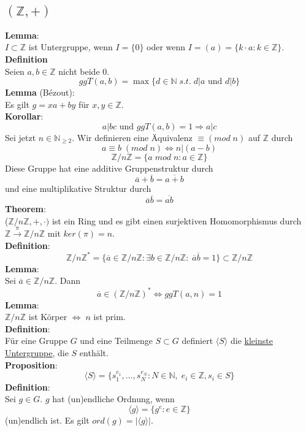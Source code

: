 \documentclass[a4paper, 12pt]{article}
\begin{document}
\subsection{$(\mathbb{Z}, +)$}
\textbf{Lemma}:\\ $I\subset \mathbb{Z}$ ist Untergruppe, wenn $I = \{0\}$ oder wenn $I = (a) = \{k\cdot a: k \in \mathbb{Z}\}$.
\textbf{Definition}\\
Seien $a,b\in\mathbb{Z}$ nicht beide 0. \[ggT(a,b) = \max\{d \in \mathbb{N} \; s.t.\; d|a \text{ und } d|b\}\]
\textbf{Lemma} (Bézout):\\
Es gilt $g = xa+by$ für $x,y \in \mathbb{Z}$.\\
\textbf{Korollar}:
\[a|bc \text{ und } ggT(a,b) = 1 \Rightarrow a|c\]
Sei jetzt $n \in \mathbb{N}_{\geq 2}$. Wir definieren eine Äquivalenz $\equiv (mod\; n)$ auf $\mathbb{Z}$ durch \[a\equiv b\; (mod\; n) \Leftrightarrow n|(a-b)\]
\[\mathbb{Z}/n\mathbb{Z} = \{a \;mod\; n: a\in\mathbb{Z}\}\]
Diese Gruppe hat eine additive Gruppenstruktur durch \[\overline{a} + \overline{b} = \overline{a+b}\] und eine multiplikative Struktur durch \[\overline{a}\overline{b} = \overline{ab}\]
\textbf{Theorem}:\\
($\mathbb{Z}/n\mathbb{Z}, +, \cdot)$ ist ein Ring und es gibt einen surjektiven Homomorphismus durch $\mathbb{Z} \overset{\pi}{\to} \mathbb{Z}/n\mathbb{Z}$ mit $ker(\pi) = n$.\\
\textbf{Definition}:\\
\[\mathbb{Z}/n\mathbb{Z}^* = \{\overline{a} \in \mathbb{Z}/n\mathbb{Z}: \exists b \in \mathbb{Z}/n\mathbb{Z}: \; \overline{a}\overline{b} = 1\} \subset \mathbb{Z}/n\mathbb{Z}\]
\textbf{Lemma}:\\
Sei $\overline{a} \in \mathbb{Z}/n\mathbb{Z}$. Dann \[\overline{a} \in (\mathbb{Z}/n\mathbb{Z})^* \Leftrightarrow ggT(a,n) = 1\]
\textbf{Lemma}:\\
$\mathbb{Z}/n\mathbb{Z}$ ist Körper $\Leftrightarrow\; n$ ist prim.\\
\textbf{Definition}:\\
Für eine Gruppe $G$ und eine Teilmenge $S\subset G$ definiert $\langle S \rangle$ die \underline{kleinste Untergruppe}, die $S$ enthält.\\
\textbf{Proposition}:
\[\langle S \rangle = \{s_1^{e_1}, ..., s_N^{e_N}: N \in \mathbb{N}, \; e_i \in \mathbb{Z}, s_i \in S\}\]
\textbf{Definition}:\\
Sei $g\in G$. $g$ hat (un)endliche Ordnung, wenn \[\langle g \rangle = \{g^e: e \in \mathbb{Z}\}\]
(un)endlich ist. Es gilt $ord(g) = \left|\langle g \rangle \right|$.\\
\end{document}
